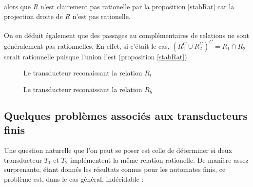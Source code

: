 \documentclass{scrartcl}
\begin{document}
\begin{flushleft}
alors que $R$ n'est clairement pas rationelle par la proposition \ref{stabRat} car la projection droite de $R$ n'est pas rationelle.
\\~\\
On en déduit également que des passages au complémentaires de relations ne sont généralement pas rationnelles. En effet, si
c'était le cas,
$(R_1^C \cup R_2^C)^C  = R_1 \cap R_2$ serait rationnelle puisque l'union l'est (proposition \ref{stabRat}).
\begin{figure}[h] 
    \caption{Le transducteur reconaissant la relation $R_l$}\label{autoRl}
    \begin{center}
    \end{center}
\end{figure}

\begin{figure}[h] 
    \caption{Le transducteur reconaissant la relation $R_b$}\label{autoRb}
    \begin{center}
    \end{center}
\end{figure}

\subsection{Quelques problèmes associés aux transducteurs finis}

Une question naturelle que l'on peut se poser est celle de déterminer si deux transducteur $T_1$ et $T_2$ implémentent la même relation rationelle.
De manière assez surprenante, étant donnés les résultats connus pour les automates finis, ce problème est, dans le cas général, indécidable \cite{indecEqu} :


\end{flushleft}
\end{document}
